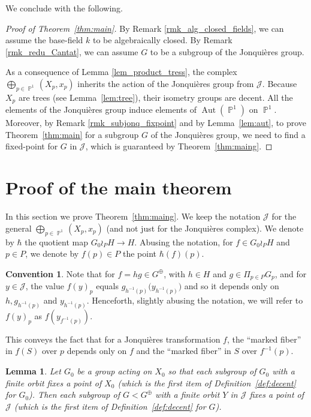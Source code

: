 \documentclass[JEP,XML,SOM,Unicode, NoEqCountersInSection,published]{cedram}
\newcommand{\p}{\operatorname{\mathbb{P}}}\let\P\p
\newcommand{\Aut}{\operatorname{Aut}}
\newcommand{\Jon}{\mathscr{J}}
\theoremstyle{plain}
\newtheorem{lemma}[theorem]{Lemma}
\theoremstyle{definition}
\newtheorem{conv}[theorem]{Convention}
\begin{document}
{We conclude with the following.}

\begin{proof}[Proof of Theorem~\ref{thm:main}]
By Remark \ref{rmk_alg_closed_fields}, we can assume the {base-field $k$} to be algebraically closed. By Remark \ref{rmk_redu_Cantat}, we can assume $G$ to be a subgroup of the Jonquières group.

As a consequence of Lemma \ref{lem_product_tress}, the complex $\bigoplus_{p\in \p^1} (X_p,x_p)$ inherits the action of the Jonquières group from $\Jon$. Because $X_p$ are trees (see Lemma~\ref{lem:tree}), {their isometry groups are decent}. All the elements of the Jonquières group induce elements of $\Aut(\p^1)$ on $\p^1$.
Moreover, by Remark \ref{rmk_subjonq_fixpoint} and by Lemma~\ref{lem:aut}, to prove Theorem~\ref{thm:main} for a subgroup $G$ of the Jonquières group, we need to find a fixed-point for $G$ in $\Jon$, {which is guaranteed by} Theorem~\ref{thm:maing}.
\end{proof}

\section{Proof of the main theorem}
\label{sec:main}

In this section we prove Theorem~\ref{thm:maing}. We keep the notation $\Jon$ for the general $\bigoplus_{p\in \p^1} (X_p,x_p)$ (and not just for the Jonquières complex). We denote by $\hbar$ the quotient map $G_0\wr_P H\to H$. Abusing the notation, for $f\in G_0\wr_P H$ and $p\in P$, we denote by $f(p)\in P$ the point $\hbar(f)(p)$.

\begin{conv}
\label{conv:fibre}
Note that for $f=hg\in G^\oplus$, with $h\in H$ and $g\in\Pi_{p\in P} G_p$, and for $y\in \Jon$, the value $f(y)_p$ equals $g_{h^{-1}(p)}\big(y_{h^{-1}(p)}\big)$ and so it depends only on $h,g_{h^{-1}(p)}$ and $y_{h^{-1}(p)}$. Henceforth, slightly abusing the notation, we will refer to $f(y)_p$ as $f(y_{f^{-1}(p)})$.
\end{conv}

This conveys the fact that for a Jonquières transformation $f$, the ``marked fiber'' in $f(S)$ over $p$ depends only on $f$ and the ``marked fiber'' in $S$ over $f^{-1}(p)$.

{
\begin{lemma}
\label{lem:first_item}
Let $G_0$ be a group acting on $X_0$ so that each subgroup of $G_0$ with a finite orbit fixes a point of $X_0$ (which is the first item of Definition~\ref{def:decent} for $G_0$). Then each subgroup of $G<G^\oplus$ with a finite orbit $Y$ in $\Jon$ fixes a point of $\Jon$ (which is the first item of Definition~\ref{def:decent} for $G$).
\end{lemma}}
\end{document}
